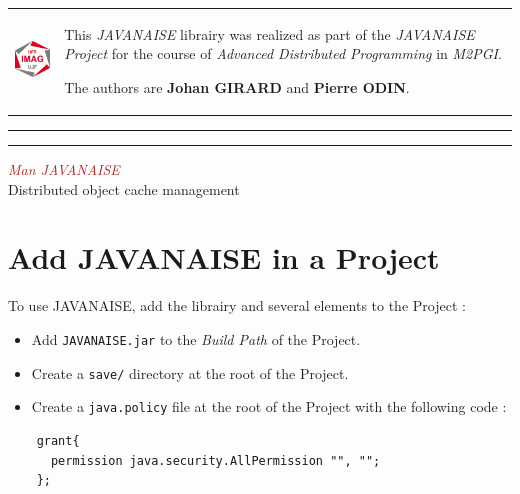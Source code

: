 \documentclass{article}
\newcommand*{\titleBC}{\begingroup %
\centering %

\def\CP{\textit{\Huge Man JAVANAISE}} %

\settowidth{\unitlength}{\CP} %
\textcolor{FireBrick}{\CP} \\[\baselineskip] %
{\color{Grey}\Large Distributed object cache management} \\ %
\endgroup}
\begin{document}
\begin{table}[h]
    \begin{center}
    \begin{tabular}{ >{\centering\arraybackslash}m{1.5in} >{\arraybackslash}m{4in} }

    \vspace{5mm} \includegraphics[width=2cm]{logo.jpg} & \vspace{9mm} This \textit{JAVANAISE} librairy was realized as part of the \textit{JAVANAISE Project} for the course of \textit{Advanced Distributed Programming} in \textit{M2PGI}.

The authors are \textbf{Johan GIRARD} and \textbf{Pierre ODIN}.

  \end{tabular}

  \label{tabular:UKJPNdata}
  \end{center}
\end{table}

\hrule\hrule

\vspace{1.5cm}

\titleBC

\vspace{1cm}

\section{Add JAVANAISE in a Project}

To use JAVANAISE, add the librairy and several elements to the Project :
\begin{itemize}
\item Add \texttt{JAVANAISE.jar} to the \textit{Build Path} of the Project.
\item Create a \texttt{save/} directory at the root of the Project.
\item Create a \texttt{java.policy} file at the root of the Project with the following code :
\end{itemize}

\noindent
\begin{verbatim}
    grant{
      permission java.security.AllPermission "", "";
    };
\end{verbatim}
\end{document}
